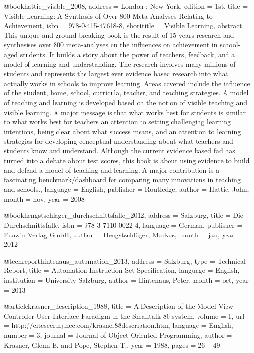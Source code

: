 {@book{hattie_visible_2008,
  address    = {London ; New York},
  edition    = {1st},
  title      = {Visible {Learning}: {A} {Synthesis} of {Over} 800 {Meta}-{Analyses} {Relating} to {Achievement}},
  isbn       = {978-0-415-47618-8},
  shorttitle = {Visible {Learning}},
  abstract   = {This unique and ground-breaking book is the result of 15 years research and synthesises over 800 meta-analyses on the influences on achievement in school-aged students. It builds a story about the power of teachers, feedback, and a model of learning and understanding. The research involves many millions of students and represents the largest ever evidence based research into what actually works in schools to improve learning. Areas covered include the influence of the student, home, school, curricula, teacher, and teaching strategies. A model of teaching and learning is developed based on the notion of visible teaching and visible learning. A major message is that what works best for students is similar to what works best for teachers {\textendash} an attention to setting challenging learning intentions, being clear about what success means, and an attention to learning strategies for developing conceptual understanding about what teachers and students know and understand. Although the current evidence based fad has turned into a debate about test scores, this book is about using evidence to build and defend a model of teaching and learning. A major contribution is a fascinating benchmark/dashboard for comparing many innovations in teaching and schools.},
  language   = {English},
  publisher  = {Routledge},
  author     = {Hattie, John},
  month      = nov,
  year       = {2008}
}

@book{hengstschlager_durchschnittsfalle_2012,
  address   = {Salzburg},
  title     = {Die {Durchschnittsfalle}},
  isbn      = {978-3-7110-0022-4},
  language  = {German},
  publisher = {Ecowin Verlag GmbH},
  author    = {Hengstschl{\"a}ger, Markus},
  month     = jan,
  year      = {2012}
}

@techreport{hintenaus_automation_2013,
  address     = {Salzburg},
  type        = {Technical {Report}},
  title       = {Automation {Instruction} {Set} {Specification}},
  language    = {English},
  institution = {University Salzburg},
  author      = {Hintenaus, Peter},
  month       = oct,
  year        = {2013}
}

@article{krasner_description_1988,
  title    = {A {Description} of the {Model}-{View}-{Controller} {User} {Interface} {Paradigm} in the {Smalltalk}-80 system},
  volume   = {1},
  url      = {http://citeseer.nj.nec.com/krasner88description.htm},
  language = {English},
  number   = {3},
  journal  = {Journal of Object Oriented Programming},
  author   = {Krasner, Glenn E. and Pope, Stephen T.},
  year     = {1988},
  pages    = {26 -- 49}
}

}
